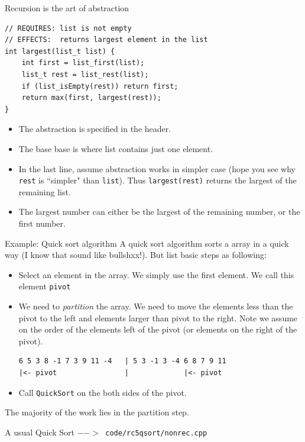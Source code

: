 \begin{frame}[fragile]{Recursion is the art of abstraction}
\begin{verbatim}
// REQUIRES: list is not empty
// EFFECTS:  returns largest element in the list
int largest(list_t list) {
    int first = list_first(list);
    list_t rest = list_rest(list);
    if (list_isEmpty(rest)) return first;
    return max(first, largest(rest));
}
\end{verbatim}
\begin{itemize}
	\item The abstraction is specified in the header.
	\item The base base is where list contains just one element.
	\item In the last line, assume abstraction works in simpler case (hope you see why \texttt{rest} is ``simpler" than \texttt{list}). Thus \texttt{largest(rest)} returns the largest of the remaining list.
	\item The largest number can either be the largest of the remaining number, or the first number. 
\end{itemize}
\end{frame}

\begin{frame}[fragile]{Example: Quick sort algorithm}
A quick sort algorithm sorts a array in a quick way (I know that sound like bullshxx!). But list basic steps as following:
\begin{itemize}
	\item Select an element in the array. We simply use the first element. We call this element \texttt{pivot}
	\item We need to \textit{partition} the array. We need to move the elements less than the pivot to the left and elements larger than pivot to the right. Note we assume on the order of the elements left of the pivot (or elements on the right of the pivot).
\begin{verbatim}
6 5 3 8 -1 7 3 9 11 -4   | 5 3 -1 3 -4 6 8 7 9 11
|<- pivot                |             |<- pivot
\end{verbatim}
	\item Call \texttt{QuickSort} on the both sides of the pivot.
\end{itemize}
The majority of the work lies in the partition step. 
\end{frame}

\begin{frame}{A usual Quick Sort}
\texttt{$-->$ code/rc5qsort/nonrec.cpp}
\inputminted{c++}{code/rc5qsort/nonrec.cpp}
\end{frame}

